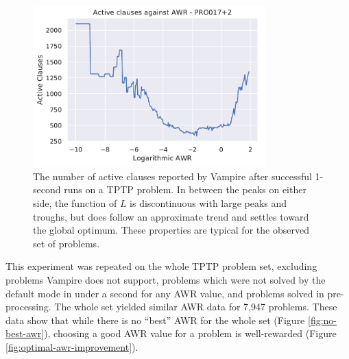 \documentclass{llncs}
\begin{document}
\begin{figure}[t]
	\centering
	\includegraphics[width=0.8\textwidth]{example-optimal-awr}
	\caption{
The number of active clauses reported by Vampire after successful 1-second runs on a TPTP problem.
In between the peaks on either side, the function of \(L\) is discontinuous with large peaks and troughs, but does follow an approximate trend and settles toward the global optimum.
These properties are typical for the observed set of problems.
}
	\label{fig:example-optimal-awr}
\end{figure}

This experiment was repeated on the whole TPTP problem set, excluding problems Vampire does not support, problems which were not solved by the default mode in under a second for any AWR value, and problems solved in pre-processing.
The whole set yielded similar AWR data for 7,947 problems.
These data show that while there is no ``best'' AWR for the whole set (Figure \ref{fig:no-best-awr}), choosing a good AWR value for a problem is well-rewarded (Figure \ref{fig:optimal-awr-improvement}).

\noindent
\\
\end{document}
